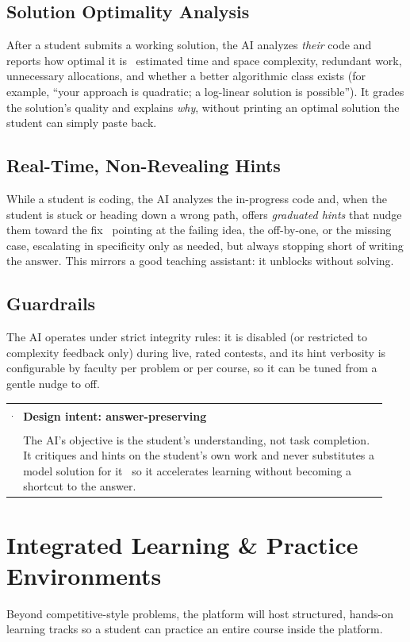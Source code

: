 \documentclass[12pt,a4paper,oneside]{report}
\makeatletter
\newenvironment{callout}[1]{\par\vspace{4pt}\noindent
  \begin{tabular}{@{}p{0.014\linewidth}@{\hspace{0.6em}}p{0.93\linewidth}@{}}
  \textcolor{boxframe}{\rule{2pt}{\baselineskip}} & \textbf{\textcolor{tcetblue}{#1}}\\[2pt] & }{\end{tabular}\par\vspace{6pt}}
\makeatother
\begin{document}
\subsection{Solution Optimality Analysis}
After a student submits a working solution, the AI analyzes \emph{their} code and
reports how optimal it is \textemdash\ estimated time and space complexity,
redundant work, unnecessary allocations, and whether a better algorithmic class
exists (for example, ``your approach is quadratic; a log-linear solution is
possible''). It grades the solution's quality and explains \emph{why}, without
printing an optimal solution the student can simply paste back.

\subsection{Real-Time, Non-Revealing Hints}
While a student is coding, the AI analyzes the in-progress code and, when the
student is stuck or heading down a wrong path, offers \emph{graduated hints} that
nudge them toward the fix \textemdash\ pointing at the failing idea, the
off-by-one, or the missing case, escalating in specificity only as needed, but
always stopping short of writing the answer. This mirrors a good teaching
assistant: it unblocks without solving.

\subsection{Guardrails}
The AI operates under strict integrity rules: it is disabled (or restricted to
complexity feedback only) during live, rated contests, and its hint verbosity is
configurable by faculty per problem or per course, so it can be tuned from a
gentle nudge to off.

\begin{callout}{Design intent: answer-preserving}
The AI's objective is the student's understanding, not task completion. It
critiques and hints on the student's own work and never substitutes a model
solution for it \textemdash\ so it accelerates learning without becoming a
shortcut to the answer.
\end{callout}

\section{Integrated Learning \& Practice Environments}
Beyond competitive-style problems, the platform will host structured, hands-on
learning tracks so a student can practice an entire course inside the platform.
\end{document}

